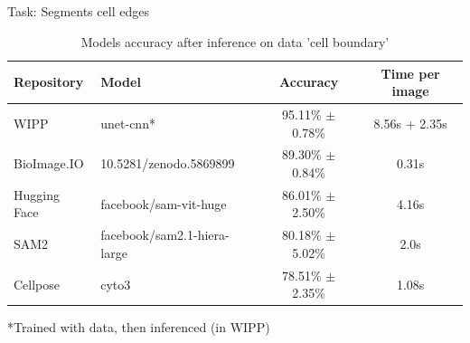 \subsection{\slidetitle}
\begin{frame}
  \frametitle{\sectiontitle}
  \framesubtitle{\slidetitle}

  Task: Segments cell edges

  \begin{center}
    \begin{table}
      \begin{tabular}{|l|l|c|c|}
       \hline
       \rowcolor{tableFirstRowColor}  Repository    & Model                       & Accuracy              & Time per image \\ [0.5ex]
       \hline
       \cellcolor{tableFirstColColor} WIPP          & unet-cnn*                   & 95.11\% $\pm$ 0.78\%  & 8.56s + 2.35s \\
       \hline
       \cellcolor{tableFirstColColor} BioImage.IO   & 10.5281/zenodo.5869899      & 89.30\% $\pm$ 0.84\%  & 0.31s \\
       \hline
       \cellcolor{tableFirstColColor} Hugging Face  & facebook/sam-vit-huge       & 86.01\% $\pm$ 2.50\%  & 4.16s \\
       \hline
       \hline
       \cellcolor{tableFirstColColor} SAM2          & facebook/sam2.1-hiera-large & 80.18\% $\pm$ 5.02\%  & 2.0s \\
       \hline
       \cellcolor{tableFirstColColor} Cellpose      & cyto3                       & 78.51\% $\pm$ 2.35\%  & 1.08s \\
       \hline
      \end{tabular}
      \caption{Models accuracy after inference on data 'cell boundary'}
    \end{table}
  \end{center}

  *Trained with data, then inferenced (in WIPP)

\end{frame}

\def\slidetitle{Data 'nuclei segmentation'}

